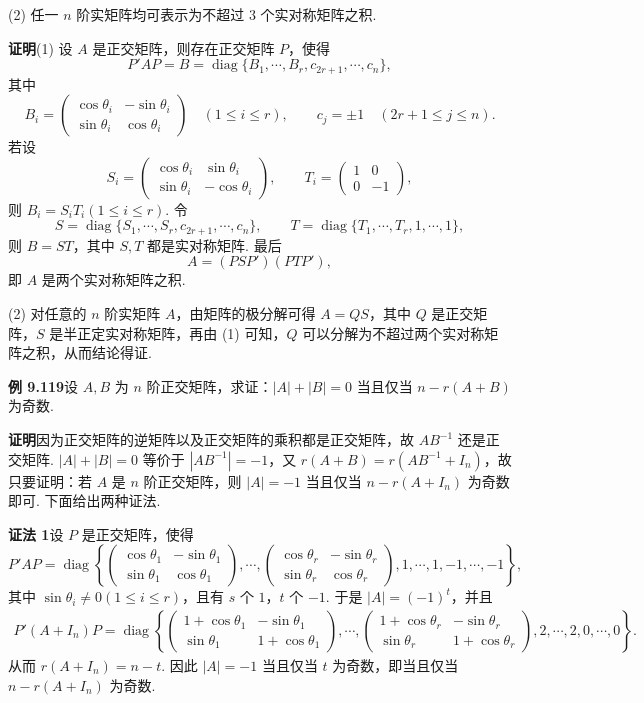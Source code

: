 \documentclass[UTF8, 12pt, fontset=fandol, oneside]{ctexart}
\begin{document}
(2) 任一 $n$ 阶实矩阵均可表示为不超过 $3$ 个实对称矩阵之积.

\noindent\textbf{证明}\quad (1) 设 $A$ 是正交矩阵，则存在正交矩阵 $P$，使得
\[
P'AP=B=\operatorname{diag}\{B_1,\cdots,B_r,c_{2r+1},\cdots,c_n\},
\]
其中
\[
B_i=\begin{pmatrix}
\cos\theta_i&-\sin\theta_i\\
\sin\theta_i&\cos\theta_i
\end{pmatrix}\quad (1\le i\le r),\qquad c_j=\pm1\quad (2r+1\le j\le n).
\]
若设
\[
S_i=\begin{pmatrix}
\cos\theta_i&\sin\theta_i\\
\sin\theta_i&-\cos\theta_i
\end{pmatrix},\qquad
T_i=\begin{pmatrix}
1&0\\
0&-1
\end{pmatrix},
\]
则 $B_i=S_iT_i(1\le i\le r)$. 令
\[
S=\operatorname{diag}\{S_1,\cdots,S_r,c_{2r+1},\cdots,c_n\},\qquad
T=\operatorname{diag}\{T_1,\cdots,T_r,1,\cdots,1\},
\]
则 $B=ST$，其中 $S,T$ 都是实对称矩阵. 最后
\[
A=(PSP')(PTP'),
\]
即 $A$ 是两个实对称矩阵之积.

(2) 对任意的 $n$ 阶实矩阵 $A$，由矩阵的极分解可得 $A=QS$，其中 $Q$ 是正交矩阵，$S$ 是半正定实对称矩阵，再由 (1) 可知，$Q$ 可以分解为不超过两个实对称矩阵之积，从而结论得证.

\noindent\textbf{例 9.119}\quad 设 $A,B$ 为 $n$ 阶正交矩阵，求证：$|A|+|B|=0$ 当且仅当 $n-r(A+B)$ 为奇数.

\noindent\textbf{证明}\quad 因为正交矩阵的逆矩阵以及正交矩阵的乘积都是正交矩阵，故 $AB^{-1}$ 还是正交矩阵. $|A|+|B|=0$ 等价于 $|AB^{-1}|=-1$，又 $r(A+B)=r(AB^{-1}+I_n)$，故只要证明：若 $A$ 是 $n$ 阶正交矩阵，则 $|A|=-1$ 当且仅当 $n-r(A+I_n)$ 为奇数即可. 下面给出两种证法.

\noindent\textbf{证法 1}\quad 设 $P$ 是正交矩阵，使得
\[
P'AP=\operatorname{diag}\left\{
\begin{pmatrix}
\cos\theta_1&-\sin\theta_1\\
\sin\theta_1&\cos\theta_1
\end{pmatrix},\cdots,
\begin{pmatrix}
\cos\theta_r&-\sin\theta_r\\
\sin\theta_r&\cos\theta_r
\end{pmatrix},
1,\cdots,1,-1,\cdots,-1
\right\},
\]
其中 $\sin\theta_i\ne0(1\le i\le r)$，且有 $s$ 个 $1$，$t$ 个 $-1$. 于是 $|A|=(-1)^t$，并且
\[
\begin{aligned}
P'(A+I_n)P
=\operatorname{diag}\left\{
\begin{pmatrix}
1+\cos\theta_1&-\sin\theta_1\\
\sin\theta_1&1+\cos\theta_1
\end{pmatrix},\cdots,
\begin{pmatrix}
1+\cos\theta_r&-\sin\theta_r\\
\sin\theta_r&1+\cos\theta_r
\end{pmatrix},
2,\cdots,2,0,\cdots,0
\right\}.
\end{aligned}
\]
从而 $r(A+I_n)=n-t$. 因此 $|A|=-1$ 当且仅当 $t$ 为奇数，即当且仅当 $n-r(A+I_n)$ 为奇数.
\end{document}
